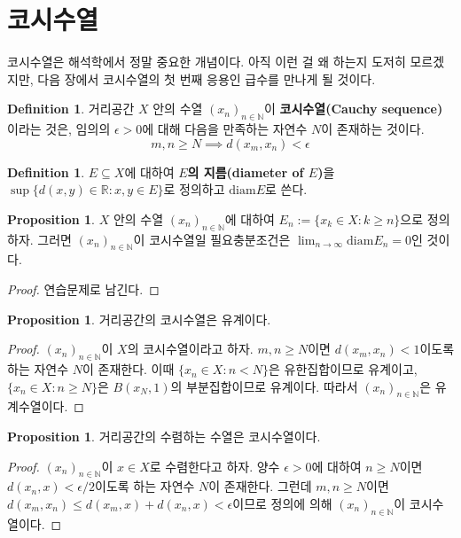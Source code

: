 \documentclass[11pt]{book}
\numberwithin{equation}{chapter}
\def\NN{\mathbb{N}}
\def\RR{\mathbb{R}}
\def\eps{\epsilon}
\def\diam{\text{diam}}
\theoremstyle{definition}
\newtheorem{prop}[thm]{Proposition}
\newtheorem{defn}[thm]{Definition}
\begin{document}
\section{코시수열}

코시수열은 해석학에서 정말 중요한 개념이다. 아직 이런 걸 왜 하는지 도저히 모르겠지만, 다음 장에서 코시수열의 첫 번째 응용인 급수를 만나게 될 것이다.

\begin{defn}
    거리공간 \(X\) 안의 수열 \((x_n)_{n \in \NN}\)이 \textbf{코시수열(Cauchy sequence)}이라는 것은, 임의의 \(\eps > 0\)에 대해 다음을 만족하는 자연수 \(N\)이 존재하는 것이다.
    \[
    m, n \ge N \implies d(x_m, x_n) < \eps    
    \]
\end{defn}

\begin{defn}
    \(E \subseteq X\)에 대하여 \textbf{\(E\)의 지름(diameter of \(E\))}을 \(\sup \{d(x, y) \in \RR : x, y \in E\}\)로 정의하고 \(\diam E\)로 쓴다.
\end{defn}

\begin{prop}
    \(X\) 안의 수열 \((x_n)_{n \in \NN}\)에 대하여 \(E_n := \{x_k \in X : k \ge n\}\)으로 정의하자. 그러면 \((x_n)_{n \in \NN}\)이 코시수열일 필요충분조건은 \(\lim_{n \to \infty} \diam E_n = 0\)인 것이다.
\end{prop}
\begin{proof}
    연습문제로 남긴다.
\end{proof}

\begin{prop}
    거리공간의 코시수열은 유계이다.
\end{prop}
\begin{proof}
    \((x_n)_{n \in \NN}\)이 \(X\)의 코시수열이라고 하자. \(m, n \ge N\)이면 \(d(x_m, x_n) < 1\)이도록 하는 자연수 \(N\)이 존재한다. 이때 \(\{x_n \in X : n < N\}\)은 유한집합이므로 유계이고, \(\{x_n \in X : n \ge N\}\)은 \(B(x_N, 1)\)의 부분집합이므로 유계이다. 따라서 \((x_n)_{n \in \NN}\)은 유계수열이다.
\end{proof}

\begin{prop} \label{prop 4.4.5}
    거리공간의 수렴하는 수열은 코시수열이다.
\end{prop}
\begin{proof}
    \((x_n)_{n \in \NN}\)이 \(x \in X\)로 수렴한다고 하자. 양수 \(\eps > 0\)에 대하여 \(n \ge N\)이면 \(d(x_n, x) < \eps/2\)이도록 하는 자연수 \(N\)이 존재한다. 그런데 \(m, n \ge N\)이면 \(d(x_m, x_n) \le d(x_m, x) + d(x_n, x) < \eps\)이므로 정의에 의해 \((x_n)_{n \in \NN}\)이 코시수열이다.
\end{proof}
\end{document}
